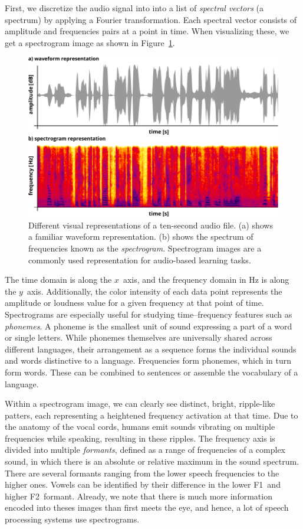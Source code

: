 First, we discretize the audio signal into into a list of \emph{spectral vectors} (a spectrum) by applying a Fourier transformation. Each spectral vector consists of amplitude and frequencies pairs at a point in time. When visualizing these, we get a spectrogram image as shown in Figure~\ref{fig:waveform}. 
%
	\begin{figure}[tp]
  		\centering
    	\includegraphics{img/waveform.pdf}
    	\caption{Different visual representations of a ten-second audio file. (a) shows a familiar waveform representation. (b) shows the spectrum of frequencies known as the \emph{spectrogram}. Spectrogram images  are a commonly used representation for audio-based learning tasks.}
    	\label{fig:waveform}
	\end{figure}
%

The time domain is along the $x$~axis, and the frequency domain in Hz is along the $y$~axis. Additionally, the color intensity of each data point represents the amplitude or loudness value for a given frequency at that point of time. Spectrograms are especially useful for studying time--frequency features such as \emph{phonemes}. A phoneme is the smallest unit of sound expressing a part of a word or single letters. While phonemes themselves are universally shared across different languages, their arrangement as a sequence forms the individual sounds and words distinctive to a language. Frequencies form phonemes, which in turn form words. These can be combined to sentences or assemble the vocabulary of a language.

Within a spectrogram image, we can clearly see distinct, bright, ripple-like patters, each representing a heightened frequency activation at that time. Due to the anatomy of the vocal cords, humans emit sounds vibrating on multiple frequencies while speaking, resulting in these ripples. 
The frequency axis is divided into multiple \emph{formants}, defined as a range of frequencies of a complex sound, in which there is an absolute or relative maximum in the sound spectrum. There are several formants ranging from the lower speech frequencies to the higher ones. Vowels can be identified by their difference in the lower F1~and higher F2~formant. Already, we note that there is much more information encoded into theses images than first meets the eye, and hence, a lot of speech processing systems use spectrograms.

